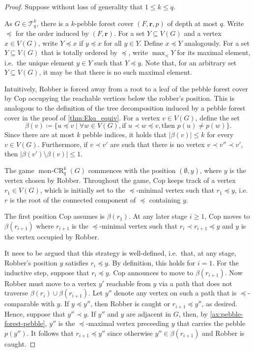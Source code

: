 \documentclass{lmcs}
\theoremstyle{plain}\newtheorem{claim}[thm]{Claim}   %
\newcommand{\cT}{\ensuremath{\mathcal T}}
\DeclareMathOperator{\monCR}{mon-CR}
\newcommand{\Ekq}{\ensuremath{\cT_{q}^{k}}}
\renewcommand{\vec}[1]{\ensuremath{\boldsymbol{#1}}}
\begin{document}
\begin{proof}
	Suppose without loss of generality that $1\leq k\leq q$.
	
	As $G\in\Ekq$, there is a $k$-pebble forest cover $(F,\vec{r},p)$ of depth at most $q$.
	Write $\preceq$ for the order induced by $(F, \vec{r})$.
	For a set $Y\subseteq V(G)$ and a vertex $x\in V(G)$, 
	write $Y \preceq x$ if $y \preceq x$ for all $y \in Y$.
	Define $x \preceq Y$ analogously.
	For a set $Y \subseteq V(G)$ that is totally ordered by $\preceq$, write $\max_{\preceq}Y$ for its maximal element, i.e.\ the unique element $y \in Y$ such that $Y \preceq y$.
	Note that, for an arbitrary set $Y \subseteq  V(G)$, it may be that there is no such maximal element.
	
	Intuitively, Robber is forced away from a root to a leaf of the pebble forest cover by Cop occupying the reachable vertices below the robber's position.
	This is analogous to the definition of the tree decomposition induced by a pebble forest cover in the proof of \autoref{thm:Ekq_equiv}.
	For a vertex $v \in V(G)$, define the set
	\[
	\beta(v) \coloneqq \{u \preceq v \mid \forall w \in V(G), \text{if } u \prec w \preceq v, \text{then } p(u) \neq p(w)\}.
	\]
	Since there are at most $k$ pebble indices, it holds that $|\beta(v)| \leq k$ for every $v \in V(G)$.
	Furthermore, if $v \prec v'$ are such that there is no  vertex $v \prec v'' \prec v'$,
	then $|\beta(v') \setminus \beta(v)| \leq 1$.
	
	The game $\monCR_q^k(G)$ commences with the position $(\emptyset, y)$, where $y$ is the vertex chosen by Robber.
	Throughout the game, Cop keeps track of a vertex $r_1 \in V(G)$, which is initially set to the $\preceq$-minimal vertex such that $r_1 \preceq y$, i.e.\ $r$ is the root of the connected component of $\preceq$ containing $y$.
	
	The first position Cop assumes is $\beta(r_1)$. 
	At any later stage $i \geq 1$, 
	Cop moves to $\beta(r_{i+1})$ where $r_{i+1}$ is the $\preceq$-minimal vertex such that $r_i \prec  r_{i+1} \preceq y$
	and $y$ is the vertex occupied by Robber.
	
	It nees to be argued that this strategy is well-defined, i.e.\ that, at any stage, Robber's position $y$ satisfies $r_i \preceq y$.
	By definition, this holds for $i = 1$.
	For the inductive step, suppose that $r_i \preceq y$. 
	Cop announces to move to $\beta(r_{i+1})$.
	Now Robber must move to a vertex $y'$ reachable from $y$ via a path that does not traverse $\beta(r_i) \cup \beta(r_{i+1})$. 
	Let $y''$ denote any vertex on such a path that is $\preceq$-comparable with $y$.
	If $y \preceq y''$,
	then Robber is  caught or $r_{i+1} \preceq y''$, as desired.
	Hence, suppose that $y'' \prec y$.
	If $y''$ and $y$ are adjacent in $G$,
	then, by \ref{ax:pebble-forest-pebble},  $y''$ is the $\preceq$-maximal vertex preceeding $y$ that carries the pebble $p(y'')$.
	It follows that $r_{i+1} \preceq y''$ since otherwise $y'' \in \beta(r_{i+1})$ and Robber is caught.
	

\end{proof}
\end{document}
